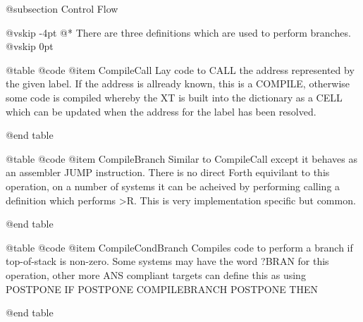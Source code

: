 @subsection Control Flow


@vskip -4pt
@*
There are three definitions which are used to perform branches.
@vskip 0pt


@table @code
@item CompileCall
Lay code to CALL the address represented by
 the given label. If the address is allready
 known, this is a COMPILE, otherwise some code is
 compiled whereby the XT is built into the
 dictionary as a CELL which can be updated when
 the address for the label has been resolved.

@end table



@table @code
@item CompileBranch
Similar to CompileCall except it behaves as an
 assembler JUMP instruction. There is no direct
 Forth equivilant to this operation, on a number
 of systems it can be acheived by performing
 calling a definition which performs >R. This is
 very implementation specific but common.

@end table



@table @code
@item CompileCondBranch
Compiles code to perform a branch if
 top-of-stack is non-zero. Some systems may have
 the word ?BRAN for this operation, other more
 ANS compliant targets can define this as using
 POSTPONE IF POSTPONE COMPILEBRANCH POSTPONE THEN

@end table

